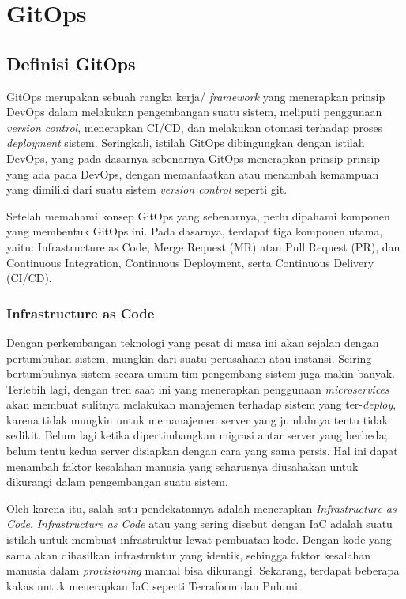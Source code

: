 \section{GitOps}


\subsection{Definisi GitOps}

GitOps merupakan sebuah rangka kerja/ \textit{framework} yang menerapkan prinsip DevOps dalam melakukan pengembangan suatu sistem, meliputi penggunaan \textit{version control}, menerapkan CI/CD, dan melakukan otomasi terhadap proses \textit{deployment} sistem\cite{gitlab}. Seringkali, istilah GitOps dibingungkan dengan istilah DevOps, yang pada dasarnya sebenarnya GitOps menerapkan prinsip-prinsip yang ada pada DevOps, dengan memanfaatkan atau menambah kemampuan yang dimiliki dari suatu sistem \textit{version control} seperti git.

Setelah memahami konsep GitOps yang sebenarnya, perlu dipahami komponen yang membentuk GitOps ini. Pada dasarnya, terdapat tiga komponen utama, yaitu: Infrastructure as Code, Merge Request (MR) atau Pull Request (PR), dan Continuous Integration, Continuous Deployment, serta Continuous Delivery (CI/CD).

\subsubsection{Infrastructure as Code}

Dengan perkembangan teknologi yang pesat di masa ini akan sejalan dengan pertumbuhan sistem, mungkin dari suatu perusahaan atau instansi. Seiring bertumbuhnya sistem secara umum tim pengembang sistem juga makin banyak. Terlebih lagi, dengan tren saat ini yang menerapkan penggunaan \textit{microservices} akan membuat sulitnya melakukan manajemen terhadap sistem yang ter-\textit{deploy}, karena tidak mungkin untuk memanajemen server yang jumlahnya tentu tidak sedikit. Belum lagi ketika dipertimbangkan migrasi antar server yang berbeda; belum tentu kedua server disiapkan dengan cara yang sama persis. Hal ini dapat menambah faktor kesalahan manusia yang seharusnya diusahakan untuk dikurangi dalam pengembangan suatu sistem.

Oleh karena itu, salah satu pendekatannya adalah menerapkan \textit{Infrastructure as Code}. \textit{Infrastructure as Code} atau yang sering disebut dengan IaC adalah suatu istilah untuk membuat infrastruktur lewat pembuatan kode. Dengan kode yang sama akan dihasilkan infrastruktur yang identik, sehingga faktor kesalahan manusia dalam \textit{provisioning} manual bisa dikurangi. Sekarang, terdapat beberapa kakas untuk menerapkan IaC seperti Terraform dan Pulumi. 

